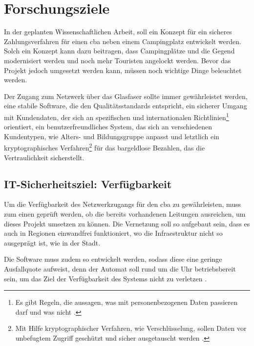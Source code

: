 \section{Forschungsziele}


In der geplanten Wissenschaftlichen Arbeit, soll ein Konzept für ein sicheres Zahlungsverfahren 
für einen \acrshort{cba} neben einem Campingplatz entwickelt werden. Solch ein Konzept kann
dazu beitragen, dass Campingplätze und die Gegend modernisiert werden und noch mehr Touristen 
angelockt werden. Bevor das Projekt jedoch umgesetzt werden kann, müssen noch wichtige Dinge 
beleuchtet werden. 


Der Zugang zum Netzwerk über das Glasfaser sollte immer gewährleistet werden, eine stabile Software, die 
den Qualitätsstandards entspricht, ein sicherer Umgang mit Kundendaten, der sich an spezifischen und
internationalen Richtlinien\footnote{Es gibt Regeln, die aussagen, was mit personenbezogenen Daten passieren
darf und was nicht \cite{refart:DSDS}.} orientiert, ein benutzerfreundliches System, das sich an verschiedenen 
Kundentypen, wie Alters- und Bildungsgruppe anpasst und letztlich ein kryptographisches Verfahren\footnote{Mit
Hilfe kryptographischer Verfahren, wie Verschlüsselung, sollen Daten vor unbefugtem Zugriff geschützt und sicher 
ausgetauscht werden \cite{refart:SLWK}.} für das bargeldlose Bezahlen, das die Vertraulichkeit sicherstellt.


\subsection{IT-Sicherheitsziel: Verfügbarkeit}
Um die Verfügbarkeit des Netzwerkzugangs für den \acrshort{cba} zu gewährleisten, muss zum einen 
geprüft werden, ob die bereits vorhandenen Leitungen ausreichen, um dieses Projekt umsetzen zu können.
Die Vernetzung soll so aufgebaut sein, dass es auch in Regionen einwandfrei funktioniert, wo die
Infraestruktur nicht so ausgeprägt ist, wie in der Stadt. 


Die Software muss zudem so entwickelt werden, sodass diese eine geringe Ausfallquote aufweist, denn der
Automat soll rund um die Uhr betriebsbereit sein, um das Ziel der Verfügbarkeit des Systems nicht zu 
verletzen \cite{refbook:SWIS}.

